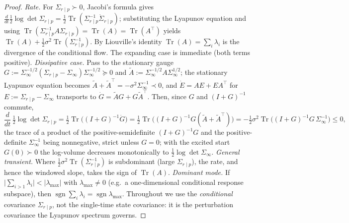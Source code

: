 \documentclass[11pt]{article}
\theoremstyle{plain}
\theoremstyle{definition}
\theoremstyle{remark}
\begin{document}
\begin{proof}
\emph{Rate.} For $\Sigma_{r\mid p}\succ0$, Jacobi's formula gives $\tfrac{d}{dt}\tfrac12\log\det\Sigma_{r\mid p}=\tfrac12\operatorname{Tr}(\Sigma_{r\mid p}^{-1}\dot\Sigma_{r\mid p})$; substituting the Lyapunov equation and using $\operatorname{Tr}(\Sigma_{r\mid p}^{-1}A\Sigma_{r\mid p})=\operatorname{Tr}(A)=\operatorname{Tr}(A^{\top})$ yields $\operatorname{Tr}(A)+\tfrac12\sigma^2\operatorname{Tr}(\Sigma_{r\mid p}^{-1})$. By Liouville's identity $\operatorname{Tr}(A)=\sum_i\lambda_i$ is the divergence of the conditional flow. The expanding case is immediate (both terms positive). \emph{Dissipative case.} Pass to the stationary gauge $G:=\Sigma_\infty^{-1/2}(\Sigma_{r\mid p}-\Sigma_\infty)\Sigma_\infty^{-1/2}\succeq0$ and $\tilde A:=\Sigma_\infty^{-1/2}A\Sigma_\infty^{1/2}$; the stationary Lyapunov equation becomes $\tilde A+\tilde A^{\top}=-\sigma^2\Sigma_\infty^{-1}\prec0$, and $\dot E=AE+EA^{\top}$ for $E:=\Sigma_{r\mid p}-\Sigma_\infty$ transports to $\dot G=\tilde A G+G\tilde A^{\top}$. Then, since $G$ and $(I+G)^{-1}$ commute,
\[
\frac{d}{dt}\,\tfrac12\log\det\Sigma_{r\mid p}=\tfrac12\operatorname{Tr}\!\big((I+G)^{-1}\dot G\big)=\tfrac12\operatorname{Tr}\!\big((I+G)^{-1}G(\tilde A+\tilde A^{\top})\big)=-\tfrac12\sigma^2\operatorname{Tr}\!\big((I+G)^{-1}G\,\Sigma_\infty^{-1}\big)\le0,
\]
the trace of a product of the positive-semidefinite $(I+G)^{-1}G$ and the positive-definite $\Sigma_\infty^{-1}$ being nonnegative, strict unless $G=0$; with the excited start $G(0)\succ0$ the log-volume decreases monotonically to $\tfrac12\log\det\Sigma_\infty$. \emph{General transient.} Where $\tfrac12\sigma^2\operatorname{Tr}(\Sigma_{r\mid p}^{-1})$ is subdominant (large $\Sigma_{r\mid p}$), the rate, and hence the windowed slope, takes the sign of $\operatorname{Tr}(A)$. \emph{Dominant mode.} If $\big|\sum_{i>1}\lambda_i\big|<|\lambda_{\max}|$ with $\lambda_{\max}\neq0$ (e.g.\ a one-dimensional conditional response subspace), then $\operatorname{sgn}\sum_i\lambda_i=\operatorname{sgn}\lambda_{\max}$. Throughout we use the \emph{conditional} covariance $\Sigma_{r\mid p}$, not the single-time state covariance: it is the perturbation covariance the Lyapunov spectrum governs.
\end{proof}
\end{document}
